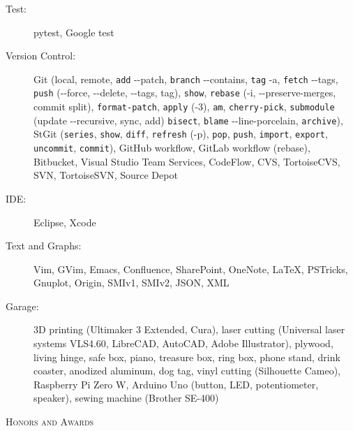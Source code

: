 \documentclass[letterpaper,11pt]{article}
\newcommand{\resheading}[1]{{\noindent\large \colorbox{mygrey}{
\begin{minipage}{1.0\textwidth}{\textsc{#1 \vphantom{p\^{E}}}}\end{minipage}}}}
\begin{document}
\begin{CJK}{UTF8}{gbsn}
\begin{description}
\item[Test:] pytest, Google test

\item[Version Control:] Git (local, remote, {\tt add} -{}-patch, {\tt branch} -{}-contains, {\tt tag} -a,
{\tt fetch} -{}-tags, {\tt push} (-{}-force, -{}-delete, -{}-tags, tag), {\tt show}, {\tt rebase} (-i, -{}-preserve-merges, commit split),
{\tt format-patch}, {\tt apply} (-3), {\tt am}, {\tt cherry-pick}, {\tt submodule} (update -{}-recursive, sync, add)
{\tt bisect}, {\tt blame} -{}-line-porcelain, {\tt archive}),
%
StGit ({\tt series}, {\tt show}, {\tt diff}, {\tt refresh} (-p), {\tt pop}, {\tt push},
{\tt import}, {\tt export}, {\tt uncommit}, {\tt commit}),
%
GitHub workflow, GitLab workflow (rebase), Bitbucket, Visual Studio Team Services,
CodeFlow, CVS, TortoiseCVS, SVN, TortoiseSVN, Source Depot

\item[IDE:] Eclipse, Xcode

\item[Text and Graphs:] Vim, GVim, Emacs, Confluence, SharePoint, OneNote, \LaTeX, PSTricks, Gnuplot, Origin, SMIv1, SMIv2, JSON, XML

\item[Garage:] 3D printing (Ultimaker 3 Extended, Cura), laser cutting (Universal laser systems VLS4.60, LibreCAD, AutoCAD, Adobe Illustrator),
plywood, living hinge, safe box, piano, treasure box, ring box, phone stand, drink coaster, anodized aluminum, dog tag,
vinyl cutting (Silhouette Cameo), Raspberry Pi Zero W, Arduino Uno (button, LED, potentiometer, speaker), sewing machine (Brother SE-400)

\end{description}




\resheading{Honors and Awards}%


\end{CJK}
\end{document}
